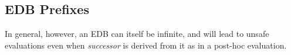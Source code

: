 











\subsection{EDB Prefixes}

In general, however, an EDB can itself be infinite, and will lead to unsafe evaluations even when \emph{successor} is derived from it
as in a post-hoc evaluation.

